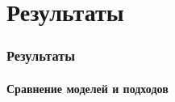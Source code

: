 \documentclass[10pt]{beamer}
\begin{document}
\section{Результаты}
\begin{frame}
\frametitle{Результаты}
\framesubtitle{Сравнение моделей и подходов}


\end{frame}
\end{document}
